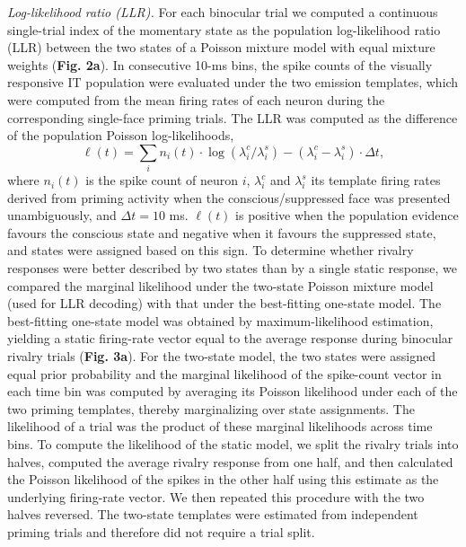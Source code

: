 \documentclass{article}
\begin{document}
\textit{Log-likelihood ratio (LLR).} For each binocular trial we computed a continuous single-trial index of the momentary state as the population log-likelihood ratio (LLR) between the two states of a Poisson mixture model with equal mixture weights (\textbf{Fig. 2a}). In consecutive 10-ms bins, the spike counts of the visually responsive IT population were evaluated under the two emission templates, which were computed from the mean firing rates of each neuron during the corresponding single-face priming trials. The LLR was computed as the difference of the population Poisson log-likelihoods,
\begin{equation*}
\ell(t) = \sum_i n_i(t) \cdot \log\!\left(\lambda_i^{c} / \lambda_i^{s}\right) - \left(\lambda_i^{c} - \lambda_i^{s}\right) \cdot \Delta t ,
\end{equation*}
where $n_i(t)$ is the spike count of neuron $i$, $\lambda_i^{c}$ and $\lambda_i^{s}$ its template firing rates derived from priming activity when the conscious/suppressed face was presented unambiguously, and $\Delta t = 10$ ms. $\ell(t)$ is positive when the population evidence favours the conscious state and negative when it favours the suppressed state, and states were assigned based on this sign. To determine whether rivalry responses were better described by two states than by a single static response, we compared the marginal likelihood under the two-state Poisson mixture model (used for LLR decoding) with that under the best-fitting one-state model. The best-fitting one-state model was obtained by maximum-likelihood estimation, yielding a static firing-rate vector equal to the average response during binocular rivalry trials (\textbf{Fig. 3a}). For the two-state model, the two states were assigned equal prior probability and the marginal likelihood of the spike-count vector in each time bin was computed by averaging its Poisson likelihood under each of the two priming templates, thereby marginalizing over state assignments. The likelihood of a trial was the product of these marginal likelihoods across time bins. To compute the likelihood of the static model, we split the rivalry trials into halves, computed the average rivalry response from one half, and then calculated the Poisson likelihood of the spikes in the other half using this estimate as the underlying firing-rate vector. We then repeated this procedure with the two halves reversed. The two-state templates were estimated from independent priming trials and therefore did not require a trial split.
\end{document}

